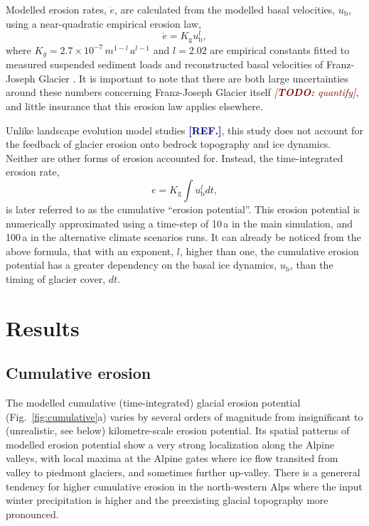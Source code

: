 \documentclass[utf8]{article}
\newcommand{\todo}[1]{\textcolor{darkred}{\emph{[\textbf{TODO:} #1]}}}
\newcommand{\aref}[0]{\textcolor{darkblue}{\textbf{[REF.]}}}
\begin{document}
    Modelled erosion rates, $\dot{e}$, are calculated from the modelled basal
    velocities, $u_\mathrm{b}$, using a near-quadratic empirical erosion law,
    \begin{equation}
        \dot{e} = K_\mathrm{g} u_\mathrm{b}^l ,
    \end{equation}
    where $K_g = 2.7\times 10^{-7}\,m^{1-l}\,a^{l-1}$ and $l = 2.02$ are
    empirical constants fitted to measured suspended sediment loads and
    reconstructed basal velocities of Franz-Joseph Glacier
    \citep{Herman.etal.2015}. It is important to note that there are both large
    uncertainties around these numbers concerning Franz-Joseph Glacier
    itself \todo{quantify}, and little insurance that this erosion law applies
    elsewhere.

    Unlike landscape evolution model studies \aref, this study does not account
    for the feedback of glacier erosion onto bedrock topography and ice dynamics.
    Neither are other forms of erosion accounted for. Instead, the
    time-integrated erosion rate,
    \begin{equation}
        e =  K_\mathrm{g} \int u_\mathrm{b}^l dt,
    \end{equation}
    is later referred to as the cumulative ``erosion potential''. This erosion
    potential is numerically approximated using a time-step of 10\,a in the
    main simulation, and 100\,a in the alternative climate scenarios runs. It
    can already be noticed from the above formula, that with an exponent, $l$,
    higher than one, the cumulative erosion potential has a greater dependency
    on the basal ice dynamics, $u_\mathrm{b}$, than the timing of glacier
    cover, $dt$.


\section{Results}

\subsection{Cumulative erosion}

    The modelled cumulative (time-integrated) glacial erosion potential
    (Fig.~\ref{fig:cumulative}a) varies by several orders of magnitude
    from insignificant to (unrealistic, see below) kilometre-scale erosion
    potential. Its spatial patterns of modelled erosion potential show a very
    strong localization along the Alpine valleys, with local maxima at
    the Alpine gates where ice flow transited from valley to piedmont glaciers,
    and sometimes further up-valley.
    There is a genereral tendency for higher cumulative erosion in the
    north-western Alps where the input winter precipitation
    \citep[WorldClim,][Fig.~1h]{Seguinot.etal.2018} is higher and the
    preexisting glacial topography more pronounced.
\end{document}
